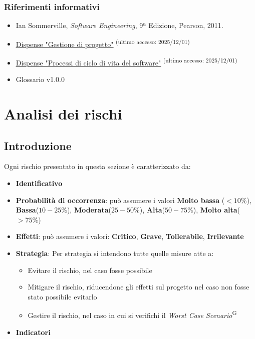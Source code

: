 \documentclass[a4paper,12pt]{article}
\begin{document}
\subsubsection{Riferimenti informativi}
\begin{itemize}
    \item Ian Sommerville, \textit{Software Engineering}, 9ª Edizione, Pearson, 2011.
    \item \href{https://www.math.unipd.it/~tullio/IS-1/2025/Dispense/T04.pdf}{\ul{Dispense "Gestione di progetto"}}  \textsuperscript{(ultimo accesso: 2025/12/01)}
    \item \href{https://www.math.unipd.it/~tullio/IS-1/2025/Dispense/T02.pdf}{\ul{Dispense "Processi di ciclo di vita del software"}}  \textsuperscript{(ultimo accesso: 2025/12/01)}
    \item Glossario v1.0.0
\end{itemize}



\section{Analisi dei rischi}

\subsection{Introduzione}
Ogni rischio presentato in questa sezione è caratterizzato da:
\begin{itemize}
    \item \textbf{Identificativo}
    \item \textbf{Probabilità di occorrenza}: può assumere i valori \textbf{Molto bassa} ($<10\%$), \textbf{Bassa}($10-25\%$), \textbf{Moderata}($25-50\%$), \textbf{Alta}($50-75\%$), \textbf{Molto alta}($>75\%$)
    \item \textbf{Effetti}: può assumere i valori: \textbf{Critico}, \textbf{Grave}, \textbf{Tollerabile}, \textbf{Irrilevante}
    \item \textbf{Strategia}: Per strategia si intendono tutte quelle misure atte a:
    \begin{itemize}
        \item Evitare il rischio, nel caso fosse possibile
        \item Mitigare il rischio, riducendone gli effetti sul progetto nel caso non fosse stato possibile evitarlo
        \item Gestire il rischio, nel caso in cui si verifichi il \textit{Worst Case Scenario}\textsuperscript{G}
    \end{itemize}
    \item \textbf{Indicatori}
\end{itemize}
\end{document}
